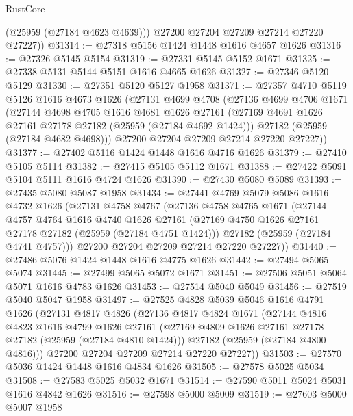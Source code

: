 \begin{lexlean}{RustCore}
\begin{coremodule}
          (@25959 (@27184 @4623 @4639)))
        @27200
        @27204
        @27209
        @27214
        @27220
        @27227))
@31314 := @27318 @5156 @1424 @1448 @1616 @4657 @1626
@31316 := @27326 @5145 @5154
@31319 := @27331 @5145 @5152 @1671
@31325 := @27338 @5131 @5144 @5151 @1616 @4665 @1626
@31327 := @27346 @5120 @5129
@31330 := @27351 @5120 @5127 @1958
@31371 := @27357
    @4710
    @5119
    @5126
    @1616
    @4673
    @1626
    (@27131
      @4699
      @4708
      (@27136
        @4699
        @4706
        @1671
        (@27144
          @4698
          @4705
          @1616
          @4681
          @1626
          @27161
          (@27169 @4691 @1626 @27161 @27178 @27182 (@25959 (@27184 @4692 @1424)))
          @27182
          (@25959 (@27184 @4682 @4698)))
        @27200
        @27204
        @27209
        @27214
        @27220
        @27227))
@31377 := @27402 @5116 @1424 @1448 @1616 @4716 @1626
@31379 := @27410 @5105 @5114
@31382 := @27415 @5105 @5112 @1671
@31388 := @27422 @5091 @5104 @5111 @1616 @4724 @1626
@31390 := @27430 @5080 @5089
@31393 := @27435 @5080 @5087 @1958
@31434 := @27441
    @4769
    @5079
    @5086
    @1616
    @4732
    @1626
    (@27131
      @4758
      @4767
      (@27136
        @4758
        @4765
        @1671
        (@27144
          @4757
          @4764
          @1616
          @4740
          @1626
          @27161
          (@27169 @4750 @1626 @27161 @27178 @27182 (@25959 (@27184 @4751 @1424)))
          @27182
          (@25959 (@27184 @4741 @4757)))
        @27200
        @27204
        @27209
        @27214
        @27220
        @27227))
@31440 := @27486 @5076 @1424 @1448 @1616 @4775 @1626
@31442 := @27494 @5065 @5074
@31445 := @27499 @5065 @5072 @1671
@31451 := @27506 @5051 @5064 @5071 @1616 @4783 @1626
@31453 := @27514 @5040 @5049
@31456 := @27519 @5040 @5047 @1958
@31497 := @27525
    @4828
    @5039
    @5046
    @1616
    @4791
    @1626
    (@27131
      @4817
      @4826
      (@27136
        @4817
        @4824
        @1671
        (@27144
          @4816
          @4823
          @1616
          @4799
          @1626
          @27161
          (@27169 @4809 @1626 @27161 @27178 @27182 (@25959 (@27184 @4810 @1424)))
          @27182
          (@25959 (@27184 @4800 @4816)))
        @27200
        @27204
        @27209
        @27214
        @27220
        @27227))
@31503 := @27570 @5036 @1424 @1448 @1616 @4834 @1626
@31505 := @27578 @5025 @5034
@31508 := @27583 @5025 @5032 @1671
@31514 := @27590 @5011 @5024 @5031 @1616 @4842 @1626
@31516 := @27598 @5000 @5009
@31519 := @27603 @5000 @5007 @1958

\end{coremodule}
\end{lexlean}
